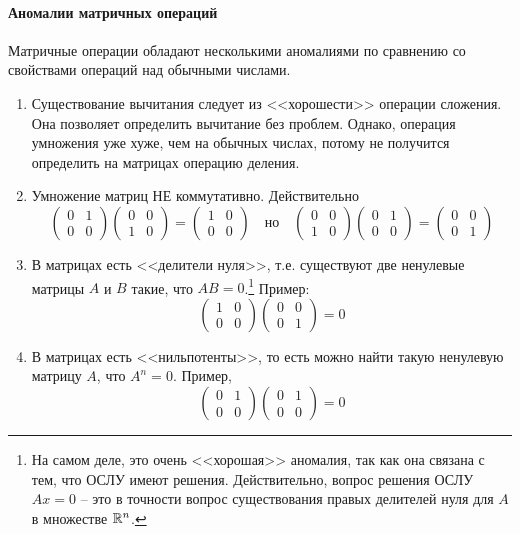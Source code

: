 \paragraph{Аномалии матричных операций}
Матричные операции обладают несколькими аномалиями по сравнению со свойствами операций над обычными числами.
\begin{enumerate}
\item Существование вычитания следует из <<хорошести>> операции сложения. Она позволяет определить вычитание без проблем. Однако, операция умножения уже хуже, чем на обычных числах, потому не получится определить на матрицах операцию деления.


\item Умножение матриц НЕ коммутативно. Действительно 
\[
\begin{pmatrix}
{0}&{1}\\
{0}&{0}
\end{pmatrix}
\begin{pmatrix}
{0}&{0}\\
{1}&{0}
\end{pmatrix}
=
\begin{pmatrix}
{1}&{0}\\
{0}&{0}
\end{pmatrix}\quad\text{но}\quad
\begin{pmatrix}
{0}&{0}\\
{1}&{0}
\end{pmatrix}
\begin{pmatrix}
{0}&{1}\\
{0}&{0}
\end{pmatrix}
=\begin{pmatrix}
{0}&{0}\\
{0}&{1}
\end{pmatrix}
\]
\item В матрицах есть <<делители нуля>>, т.е. существуют две ненулевые матрицы $A$ и $B$ такие, что $AB = 0$.\footnote{На самом деле, это очень <<хорошая>> аномалия, так как она связана с тем, что ОСЛУ имеют решения. Действительно, вопрос решения ОСЛУ $Ax = 0$ -- это в точности вопрос существования правых делителей нуля для $A$ в множестве $\mathbb R^{n}$.} Пример:
\[
\begin{pmatrix}
{1}&{0}\\
{0}&{0}
\end{pmatrix}
\begin{pmatrix}
{0}&{0}\\
{0}&{1}
\end{pmatrix}
=0
\]
\item В матрицах есть <<нильпотенты>>, то есть можно найти такую ненулевую матрицу $A$, что $A^n=0$. Пример, 
\[
\begin{pmatrix}
{0}&{1}\\
{0}&{0}
\end{pmatrix}
\begin{pmatrix}
{0}&{1}\\
{0}&{0}
\end{pmatrix}
=0
\]
\end{enumerate}

